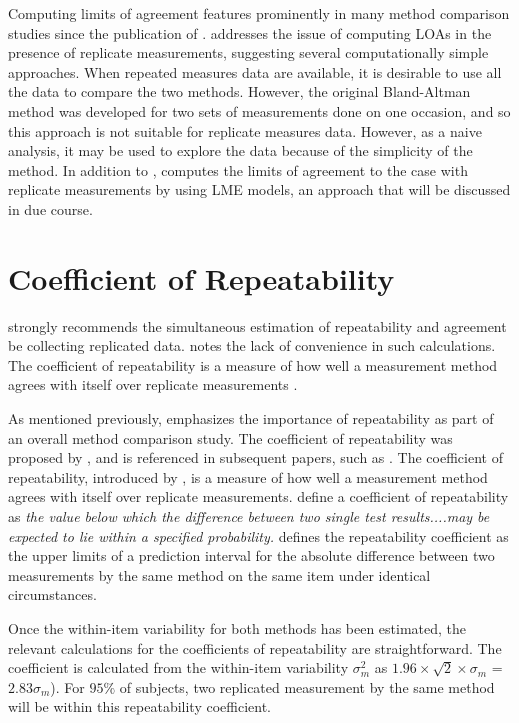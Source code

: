 \documentclass[12pt, a4paper]{report}
\theoremstyle{plain}
\theoremstyle{definition}
\theoremstyle{remark}
\begin{document}
Computing limits of agreement features prominently in many method comparison studies since the publication of \citet{BA86}.
\citet{BA99} addresses the issue of computing LOAs in the presence of replicate measurements, suggesting several computationally simple approaches. When repeated measures data are available, it is desirable to use
all the data to compare the two methods. However, the original Bland-Altman method was developed for two sets of measurements done on one occasion, and so this approach is not suitable for replicate measures data. However, as a naive analysis, it may be used to explore the data because of the simplicity of the method.
In addition to \citet{BA99}, \citet{BXC2008} computes the limits of agreement to the case with replicate measurements by using LME models, an approach that will be discussed in due course.




\section{Coefficient of Repeatability}


\citet{BA99} strongly recommends the simultaneous estimation of repeatability and agreement be collecting replicated data. \citet{ARoy2009} notes the lack of convenience in such calculations.
	The coefficient of repeatability is a measure of how well a
	measurement method agrees with itself over replicate measurements
	\citep{BA99}. 
	
	
	
	
As mentioned previously, \citet{Barnhart} emphasizes the importance of repeatability as part of an overall method comparison study. The coefficient of repeatability was proposed by \citet{BA99}, and is referenced in subsequent papers, such as \citet{BXC2008}. The coefficient of repeatability, introduced by \citet{BA99}, is a measure of how well a
measurement method agrees with itself over replicate measurements. \citet{BSIrepeat} define a coefficient of
repeatability as \emph{the value below which the difference between two single test results....may be expected to lie within a specified probability.} \citet{BA99} defines the repeatability coefficient as the upper limits of a prediction interval for the absolute difference between two measurements by the same method on the same item under identical circumstances. %

 Once the within-item variability for both methods has been estimated, the relevant calculations for the coefficients of repeatability are straightforward.
The coefficient is calculated from the within-item variability $\sigma^2_{m}$ as  $1.96 \times \sqrt{2} \times \sigma_m$ = $2.83 \sigma_m$). For $95\%$ of subjects, two replicated measurement by the same method will be within this repeatability coefficient.
	
\end{document}
